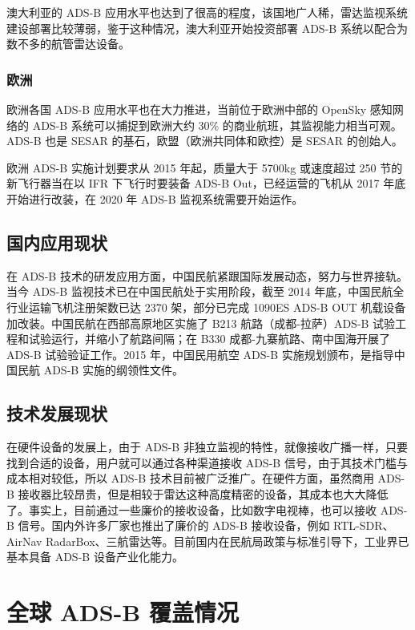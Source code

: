 澳大利亚的 ADS-B 应用水平也达到了很高的程度，该国地广人稀，雷达监视系统建设部署比较薄弱，鉴于这种情况，澳大利亚开始投资部署 ADS-B 系统以配合为数不多的航管雷达设备。

\subsubsection{欧洲}

欧洲各国 ADS-B 应用水平也在大力推进，当前位于欧洲中部的 OpenSky 感知网络的 ADS-B 系统可以捕捉到欧洲大约 30\% 的商业航班，其监视能力相当可观。ADS-B 也是 SESAR 的基石，欧盟（欧洲共同体和欧控）是 SESAR 的创始人。

欧洲 ADS-B 实施计划要求从 2015 年起，质量大于 5700kg 或速度超过 250 节的新飞行器当在以 IFR 下飞行时要装备 ADS-B Out，已经运营的飞机从 2017 年底开始进行改装，在 2020 年 ADS-B 监视系统需要开始运作。

\subsection{国内应用现状}

在 ADS-B 技术的研发应用方面，中国民航紧跟国际发展动态，努力与世界接轨。当今 ADS-B 监视技术已在中国民航处于实用阶段，截至 2014 年底，中国民航全行业运输飞机注册架数已达 2370 架，部分已完成 1090ES ADS-B OUT 机载设备加改装。中国民航在西部高原地区实施了 B213 航路（成都-拉萨）ADS-B 试验工程和试验运行，并缩小了航路间隔；在 B330 成都-九寨航路、南中国海开展了 ADS-B 试验验证工作。2015 年，中国民用航空 ADS-B 实施规划颁布，是指导中国民航 ADS-B 实施的纲领性文件。

\subsection{技术发展现状}

在硬件设备的发展上，由于 ADS-B 非独立监视的特性，就像接收广播一样，只要找到合适的设备，用户就可以通过各种渠道接收 ADS-B 信号，由于其技术门槛与
成本相对较低，所以 ADS-B 技术目前被广泛推广。在硬件方面，虽然商用 ADS-B 接收器比较昂贵，但是相较于雷达这种高度精密的设备，其成本也大大降低了。事实上，目前通过一些廉价的接收设备，比如数字电视棒，也可以接收 ADS-B 信号。国内外许多厂家也推出了廉价的 ADS-B 接收设备，例如 RTL-SDR、AirNav RadarBox、三航雷达等。目前国内在民航局政策与标准引导下，工业界已基本具备 ADS-B 设备产业化能力。

\section{全球 ADS-B 覆盖情况}

